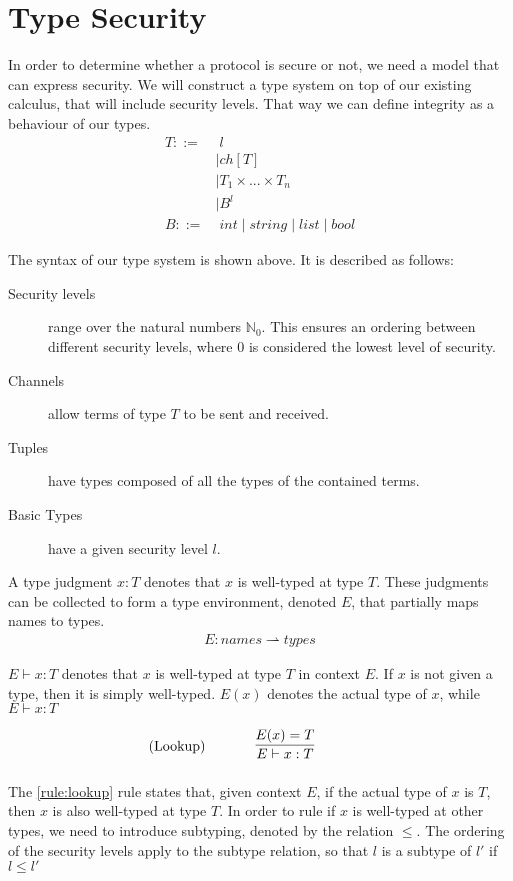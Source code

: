 \section{Type Security}
In order to determine whether a protocol is secure or not, we need a model that can express security.
We will construct a type system on top of our existing calculus, that will include security levels.
That way we can define integrity as a behaviour of our types.
\begin{align*}
	T::=&\;l \tag{Security Level}\\
	&\mid ch[T] \tag{Channel}\\
	&\mid T_1 \times...\times T_n \tag{Tuple}\\
	&\mid B^l \tag{Basic}\\
	B::=&\;int 
	\mid string 
	\mid list 
	\mid bool 
\end{align*}

\noindent The syntax of our type system is shown above. It is described as follows:

\begin{description}
\item[Security levels] range over the natural numbers $\mathbb{N}_0$. This ensures an ordering between different security levels, where $0$ is considered the lowest level of security.
\item[Channels] allow terms of type $T$ to be sent and received.
\item[Tuples] have types composed of all the types of the contained terms.
\item[Basic Types] have a given security level $l$.
\end{description}

\noindent A type judgment $x:T$ denotes that $x$ is well-typed at type $T$.
These judgments can be collected to form a type environment, denoted $E$, that partially maps names to types.
\begin{align*}
E: names \rightharpoonup types
\end{align*}

\noindent $E\vdash x:T$ denotes that $x$ is well-typed at type $T$ in context $E$.
If $x$ is not given a type, then it is simply well-typed. $E(x)$ denotes the actual type of $x$, while $E\vdash x:T$ 

\begin{align*}
\tag{Lookup}\label{rule:lookup} &\infrule{E(x)=T}{E\vdash x:T}
\end{align*}

The \ref{rule:lookup} rule states that, given context $E$, if the actual type of $x$ is $T$, then $x$ is also well-typed at type $T$. 
In order to rule if $x$ is well-typed at other types, we need to introduce subtyping, denoted by the relation $\leq$. The ordering of the security levels apply to the subtype relation, so that $l$ is a subtype of $l'$ if $l\leq l'$

